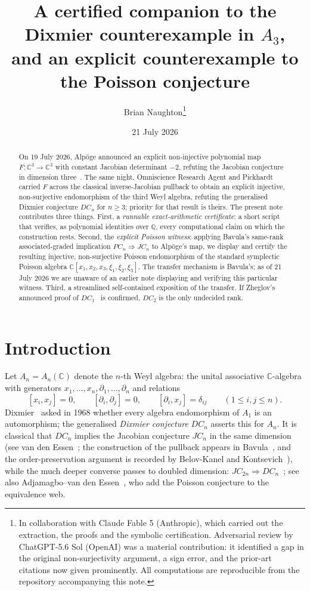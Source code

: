 \documentclass[11pt]{article}
\title{A certified companion to the Dixmier counterexample in $A_3$,\\
and an explicit counterexample to the Poisson conjecture}
\author{Brian Naughton\thanks{In collaboration with Claude Fable 5 (Anthropic), which carried out the
extraction, the proofs and the symbolic certification. Adversarial review
by ChatGPT-5.6 Sol (OpenAI) was a material contribution: it identified a
gap in the original non-surjectivity argument, a sign error, and the
prior-art citations now given prominently. All computations are
reproducible from the repository accompanying this note.}}
\date{21 July 2026}
\theoremstyle{remark}
\newcommand{\C}{\mathbb{C}}
\newcommand{\Q}{\mathbb{Q}}
\begin{document}
\maketitle

\begin{abstract}
On 19 July 2026, Alp\"oge announced an explicit non-injective polynomial map
$F\colon\C^3\to\C^3$ with constant Jacobian determinant $-2$, refuting the
Jacobian conjecture in dimension three~\cite{Alpoge2026}. The same night,
Omniscience Research Agent and Pickhardt~\cite{OP2026} carried $F$ across
the classical inverse-Jacobian pullback to obtain an explicit injective,
non-surjective endomorphism of the third Weyl algebra, refuting the
generalised Dixmier conjecture $DC_n$ for $n\ge3$; priority for that result
is theirs. The present note contributes three things. First, a
\emph{runnable exact-arithmetic certificate}: a short script that verifies,
as polynomial identities over $\Q$, every computational claim on which the
construction rests. Second, the \emph{explicit Poisson witness}: applying
Bavula's same-rank associated-graded implication $PC_n\Rightarrow JC_n$
\cite[Thm.~7]{Bavula2024} to Alp\"oge's map, we display and certify the
resulting injective, non-surjective Poisson endomorphism of the standard
symplectic Poisson algebra $\C[x_1,x_2,x_3,\xi_1,\xi_2,\xi_3]$. The
transfer mechanism is Bavula's; as of 21 July 2026 we are unaware of an
earlier note displaying and verifying this particular witness. Third, a
streamlined self-contained exposition of the transfer. If Zheglov's
announced proof of $DC_1$~\cite{Zheglov2024} is confirmed, $DC_2$ is the
only undecided rank.
\end{abstract}

\section{Introduction}

Let $A_n = A_n(\C)$ denote the $n$-th Weyl algebra: the unital associative
$\C$-algebra with generators $x_1,\dots,x_n,\partial_1,\dots,\partial_n$ and
relations
\begin{equation}\label{eq:ccr}
[x_i,x_j]=0,\qquad [\partial_i,\partial_j]=0,\qquad
[\partial_i,x_j]=\delta_{ij}\qquad(1\le i,j\le n).
\end{equation}
Dixmier~\cite{Dixmier1968} asked in 1968 whether every algebra endomorphism
of $A_1$ is an automorphism; the generalised \emph{Dixmier conjecture}
$DC_n$ asserts this for $A_n$. It is classical that $DC_n$ implies the
Jacobian conjecture $JC_n$ in the same dimension (see van den
Essen~\cite{vdE2000}; the construction of the pullback appears in
Bavula~\cite{Bavula2024}, and the order-preservation argument is recorded by
Belov-Kanel and Kontsevich~\cite[p.~2]{BKK2007}), while the much deeper
converse passes to doubled dimension: $JC_{2n}\Rightarrow
DC_n$~\cite{Tsuchimoto2005,BKK2007}; see also Adjamagbo--van den
Essen~\cite{AvdE2007}, who add the Poisson conjecture to the equivalence
web.
\end{document}
